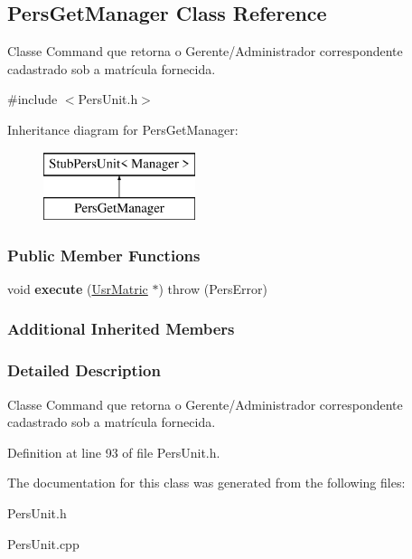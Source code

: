 \hypertarget{classPersGetManager}{\subsection{Pers\-Get\-Manager Class Reference}
\label{db/db6/classPersGetManager}
}


Classe Command que retorna o Gerente/\-Administrador correspondente cadastrado sob a matrícula fornecida.  




{\ttfamily \#include $<$Pers\-Unit.\-h$>$}

Inheritance diagram for Pers\-Get\-Manager\-:\begin{figure}[H]
\begin{center}
\leavevmode
\includegraphics[height=2.000000cm]{db/db6/classPersGetManager}
\end{center}
\end{figure}
\subsubsection*{Public Member Functions}
\begin{DoxyCompactItemize}
\item 
\hypertarget{classPersGetManager_a7bad813d5561b69e2e3dd902d28601d9}{void {\bfseries execute} (\hyperlink{classUsrMatric}{Usr\-Matric} $\ast$)  throw (\-Pers\-Error)}\label{db/db6/classPersGetManager_a7bad813d5561b69e2e3dd902d28601d9}

\end{DoxyCompactItemize}
\subsubsection*{Additional Inherited Members}


\subsubsection{Detailed Description}
Classe Command que retorna o Gerente/\-Administrador correspondente cadastrado sob a matrícula fornecida. 

Definition at line 93 of file Pers\-Unit.\-h.



The documentation for this class was generated from the following files\-:\begin{DoxyCompactItemize}
\item 
Pers\-Unit.\-h\item 
Pers\-Unit.\-cpp\end{DoxyCompactItemize}
